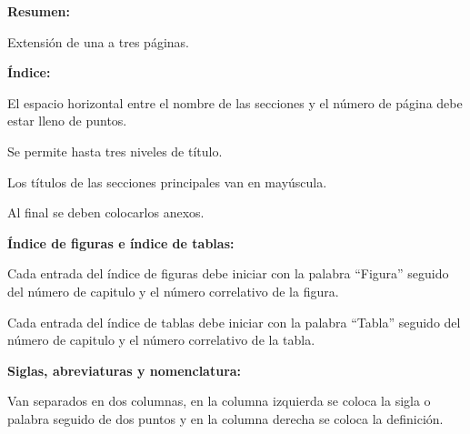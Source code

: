 {{\begin{lista}
    \item \textbf{Resumen:}
    \begin{lista}
        \item Extensión de una a tres páginas.
    \end{lista}

    \item \textbf{Índice:}
    \begin{lista}
        \item El espacio horizontal entre el nombre de las secciones y el número de página debe estar lleno de puntos.
        \item Se permite hasta tres niveles de título.
        \item Los títulos de las secciones principales van en mayúscula.
        \item Al final se deben colocarlos anexos.
    \end{lista}

    \item \textbf{Índice de figuras e índice de tablas:}
    \begin{lista}
        \item Cada entrada del índice de figuras debe iniciar con la palabra “Figura” seguido del número de capitulo y el número correlativo de la figura.
        \item Cada entrada del índice de tablas debe iniciar con la palabra “Tabla” seguido del número de capitulo y el número correlativo de la tabla.
    \end{lista}

    \item\textbf{Siglas, abreviaturas y nomenclatura:}
    \begin{lista}
        \item Van separados en dos columnas, en la columna izquierda se coloca la sigla o palabra seguido de dos puntos y en la columna derecha se coloca la definición.
    \end{lista}


\end{lista}}}
